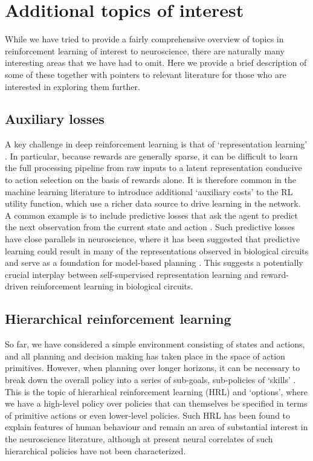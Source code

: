 \section{Additional topics of interest}
\label{sec:additional}

While we have tried to provide a fairly comprehensive overview of topics in reinforcement learning of interest to neuroscience, there are naturally many interesting areas that we have had to omit.
Here we provide a brief description of some of these together with pointers to relevant literature for those who are interested in exploring them further.

\subsection{Auxiliary losses}
\label{sec:auxiliary}
A key challenge in deep reinforcement learning is that of `representation learning' \citep{botvinick2020deep}.
In particular, because rewards are generally sparse, it can be difficult to learn the full processing pipeline from raw inputs to a latent representation conducive to action selection on the basis of rewards alone.
It is therefore common in the machine learning literature to introduce additional `auxiliary costs' to the RL utility function, which use a richer data source to drive learning in the network.
A common example is to include predictive losses that ask the agent to predict the next observation from the current state and action \citep{jaderberg2016reinforcement, zintgraf2019varibad}.
Such predictive losses have close parallels in neuroscience, where it has been suggested that predictive learning could result in many of the representations observed in biological circuits \citep{rao1999predictive, stachenfeld2017hippocampus, whittington2020tolman, blanco2021dopamine} and serve as a foundation for model-based planning \citep{jensen2023recurrent}.
This suggests a potentially crucial interplay between self-supervised representation learning and reward-driven reinforcement learning in biological circuits.

\subsection{Hierarchical reinforcement learning}
\label{sec:HRL}
So far, we have considered a simple environment consisting of states and actions, and all planning and decision making has taken place in the space of action primitives.
However, when planning over longer horizons, it can be necessary to break down the overall policy into a series of sub-goals, sub-policies of `skills' \citep{sutton1999between, pateria2021hierarchical}.
This is the topic of hierarhical reinforcement learning (HRL) and `options', where we have a high-level policy over policies that can themselves be specified in terms of primitive actions or even lower-level policies.
Such HRL has been found to explain features of human behaviour \citep{eckstein2020computational} and remain an area of substantial interest in the neuroscience literature, although at present neural correlates of such hierarchical policies have not been characterized.

